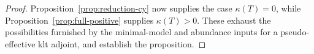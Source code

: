 \begin{proof}
Proposition~\ref{prop:reduction-cy} now supplies the case
$\kappa(T)=0$, while Proposition~\ref{prop:full-positive} supplies
$\kappa(T)>0$.  These exhaust the possibilities furnished by the
minimal-model and abundance inputs for a pseudo-effective klt
adjoint, and establish the proposition.
\end{proof}
